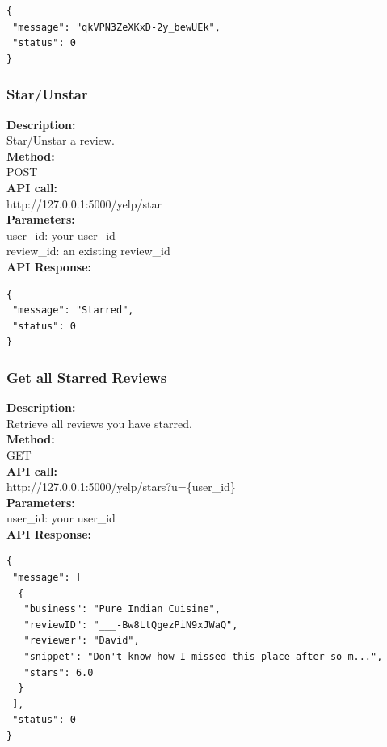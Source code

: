 \documentclass[12pt]{article}
\begin{document}
\begin{singlespacing}
\begin{lstlisting}
{
 "message": "qkVPN3ZeXKxD-2y_bewUEk",
 "status": 0
}
\end{lstlisting}
\end{singlespacing}

\subsubsection{Star/Unstar}
\textbf{Description:}\\
Star/Unstar a review.\\
\textbf{Method:}\\
POST\\
\textbf{API call:}\\
http://127.0.0.1:5000/yelp/star\\
\textbf{Parameters:}\\
user\_id: your user\_id\\
review\_id: an existing review\_id\\
\textbf{API Response:}

\begin{singlespacing}
\begin{lstlisting}
{
 "message": "Starred",
 "status": 0
}
\end{lstlisting}
\end{singlespacing}

\subsubsection{Get all Starred Reviews}
\textbf{Description:}\\
Retrieve all reviews you have starred.\\
\textbf{Method:}\\
GET\\
\textbf{API call:}\\
http://127.0.0.1:5000/yelp/stars?u=\{user\_id\}\\
\textbf{Parameters:}\\
user\_id: your user\_id\\
\textbf{API Response:}

\begin{singlespacing}
\begin{lstlisting}
{
 "message": [
  {
   "business": "Pure Indian Cuisine",
   "reviewID": "___-Bw8LtQgezPiN9xJWaQ",
   "reviewer": "David",
   "snippet": "Don't know how I missed this place after so m...",
   "stars": 6.0
  }
 ],
 "status": 0
}
\end{lstlisting}
\end{singlespacing}
\end{document}
